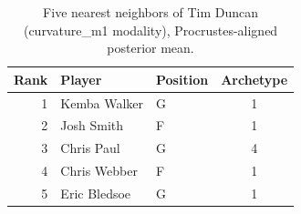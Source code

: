 \begin{table}[htbp]
  \centering\small
  \begin{tabular}{rllc}
    \toprule
    Rank & Player & Position & Archetype \\
    \midrule
    1 & Kemba Walker & G & 1 \\
    2 & Josh Smith & F & 1 \\
    3 & Chris Paul & G & 4 \\
    4 & Chris Webber & F & 1 \\
    5 & Eric Bledsoe & G & 1 \\
    \bottomrule
  \end{tabular}
  \caption{Five nearest neighbors of Tim Duncan (curvature_m1 modality), Procrustes-aligned posterior mean.}
  \label{tab:Tim_Duncan_neighbors_curvature_m1}
\end{table}

